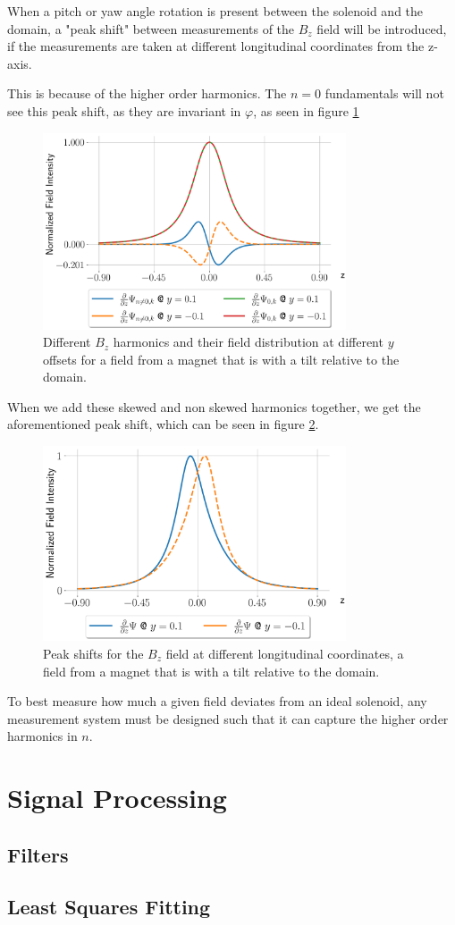 When a pitch or yaw angle rotation is present between the solenoid and 
the domain, a "peak shift" between measurements of the $B_z$
field will be introduced, if the measurements are taken at
different longitudinal coordinates from the z-axis.

This is because of the higher order harmonics. The $n=0$ fundamentals will
not see this peak shift, as they are invariant in $\varphi$,
as seen in figure \ref{fig:harmonicsskew}
\begin{figure}[!h]
    \centering
    \includegraphics[width=0.8\textwidth]{figs/harmonicsskew.png}
    \caption{Different $B_z$ harmonics and their field distribution at
    different $y$ offsets for a field from a magnet that is with a tilt
    relative to the domain.}
    \label{fig:harmonicsskew}
\end{figure}

When we add these skewed and non skewed harmonics together, we get the 
aforementioned peak shift, which can be seen in figure \ref{fig:mirrored}.

\begin{figure}[!h]
    \centering
    \includegraphics[width=0.8\textwidth]{figs/mirrored}
    \caption{Peak shifts for the $B_z$ field at different longitudinal
    coordinates, a field from a magnet that is with a tilt
    relative to the domain. }
    \label{fig:mirrored}
\end{figure}

To best measure how much a given field deviates from an ideal solenoid,
any measurement system must be designed such that it can capture the
higher order harmonics in $n$. 

\newpage
\section{Signal Processing}
\subsection{Filters}
\subsection{Least Squares Fitting}